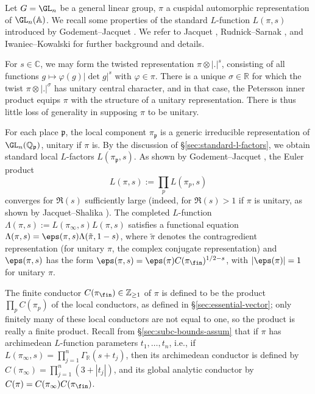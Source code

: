 Let $G = \GL_n$ be a general linear group, $\pi$ a cuspidal automorphic representation of $\GL_n(\mathbb{A})$.  We recall some properties of the standard $L$-function $L(\pi,s)$ introduced by Godement--Jacquet \cite[Lemma 10.20]{MR0342495}.  We refer to Jacquet \cite{MR546609}, Rudnick--Sarnak \cite[\S2]{MR1395406}, and Iwaniec--Kowalski \cite[\S5]{MR2061214} for further background and details.

For $s \in \mathbb{C}$, we may form the twisted representation $\pi \otimes |.|^s$, consisting of all functions $g \mapsto \varphi(g) |\det g|^s$ with $\varphi \in \pi$.  There is a unique $\sigma \in \mathbb{R}$ for which the twist $\pi \otimes |.|^\sigma$ has unitary central character, and in that case, the Petersson inner product equips $\pi$ with the structure of a unitary representation.  There is thus little loss of generality in supposing $\pi$ to be unitary.

For each place $\mathfrak{p}$, the local component $\pi_\mathfrak{p}$ is a generic irreducible representation of $\GL_n(\mathbb{Q}_\mathfrak{p})$, unitary if $\pi$ is.  By the discussion of \S\ref{sec:standard-l-factors}, we obtain standard local $L$-factors $L(\pi_\mathfrak{p},s)$.  As shown by Godement--Jacquet \cite[Lemma 10.20]{MR0342495}, the Euler product
\begin{equation*}
  L(\pi,s) := \prod_p L(\pi_p,s)
\end{equation*}
converges for $\Re(s)$ sufficiently large (indeed, for $\Re(s) > 1$ if $\pi$ is unitary, as shown by Jacquet--Shalika \cite[I, Thm 5.3]{MR618323}).  The completed $L$-function $\Lambda(\pi,s) := L(\pi_\infty,s) L(\pi,s)$ satisfies a functional equation $\Lambda(\pi,s) = \eps(\pi,s) \Lambda(\tilde{\pi},1-s)$, where $\tilde{\pi}$ denotes the contragredient representation (for unitary $\pi$, the complex conjugate representation) and $\eps(\pi,s)$ has the form $\eps(\pi,s) = \eps(\pi) C(\pi_{\fin})^{1/2-s}$, with $|\eps(\pi)| = 1$ for unitary $\pi$.

The finite conductor $C(\pi_{\fin}) \in \mathbb{Z}_{\geq 1}$ of $\pi$ is defined to be the product $\prod_p C(\pi_p)$ of the local conductors, as defined in \S\ref{sec:essential-vector}; only finitely many of these local conductors are not equal to one, so the product is really a finite product.  Recall from \S\ref{sec:subc-bounds-assum} that if $\pi$ has archimedean $L$-function parameters $t_1,\dotsc,t_n$, i.e., if $L(\pi_\infty, s) = \prod_{j=1}^n \Gamma_{\mathbb{R}}(s + t_j)$, then its archimedean conductor is defined by $C(\pi_\infty) = \prod_{j=1}^n (3 + |t_j|)$, and its global analytic conductor by $C(\pi) = C(\pi_\infty) C(\pi_{\fin})$.

